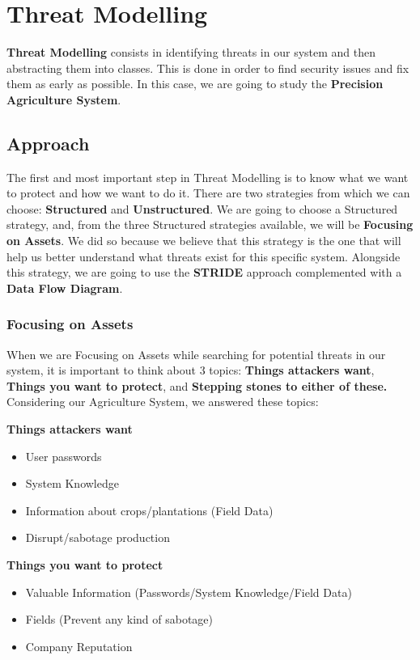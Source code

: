 \section{Threat Modelling}

\textbf{Threat Modelling} consists in identifying threats in our system and then abstracting them into classes. This is done in order to find security issues and fix them as early as possible. In this case, we are going to study the \textbf{Precision Agriculture System}.

\subsection{Approach}

The first and most important step in Threat Modelling is to know what we want to protect and how we want to do it. There are two strategies from which we can choose: \textbf{Structured} and \textbf{Unstructured}. We are going to choose a Structured strategy, and, from the three Structured strategies available, we will be \textbf{Focusing on Assets}. We did so because we believe that this strategy is the one that will help us better understand what threats exist for this specific system. Alongside this strategy, we are going to use the \textbf{STRIDE} approach complemented with a \textbf{Data Flow Diagram}.

\subsubsection{Focusing on Assets}

When we are Focusing on Assets while searching for potential threats in our system, it is important to think about 3 topics: \textbf{Things attackers want}, \textbf{Things you want to protect}, and \textbf{Stepping stones to either of these.} Considering our Agriculture System, we answered these topics:

\textbf{Things attackers want}
\begin{itemize}
  \item User passwords
  \item System Knowledge
  \item Information about crops/plantations (Field Data)
  \item Disrupt/sabotage production
\end{itemize}

\textbf{Things you want to protect}
\begin{itemize}
  \item Valuable Information (Passwords/System Knowledge/Field Data)
  \item Fields (Prevent any kind of sabotage)
  \item Company Reputation
\end{itemize}

